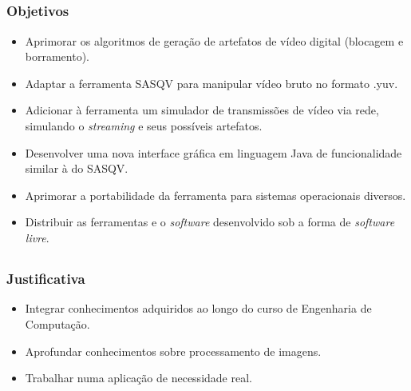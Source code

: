 \subsection{}
    \begin{frame}\frametitle{Objetivos}
        \begin{itemize}
            \item Aprimorar os algoritmos de geração de artefatos de vídeo digital (blocagem e borramento). %
            \item Adaptar a ferramenta SASQV para manipular vídeo bruto no formato .yuv.
            \item Adicionar à ferramenta um simulador de transmissões de vídeo via rede, simulando o \emph{streaming} e seus possíveis artefatos.
            \item Desenvolver uma nova interface gráfica em linguagem Java de funcionalidade similar à do SASQV.
            \item Aprimorar a portabilidade da ferramenta para sistemas operacionais diversos.
            \item Distribuir as ferramentas e o \emph{software} desenvolvido sob a forma de \emph{software livre}.
        \end{itemize}
    \end{frame}
    
\subsection{}
    \begin{frame}\frametitle{Justificativa}
        \begin{itemize}
            \item Integrar conhecimentos adquiridos ao longo do curso de Engenharia de Computação.
            \item Aprofundar conhecimentos sobre processamento de imagens.
            \item Trabalhar numa aplicação de necessidade real.
        \end{itemize}
    \end{frame} 

